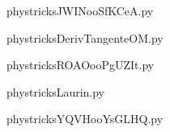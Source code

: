    

    \clearpage
    


    \newcommand{\CaptionFigJWINooSfKCeA}{<+Type your caption here+>}
    \begin{center}
        
    \end{center}
    phystricksJWINooSfKCeA.py

    

    \clearpage
    


    \newcommand{\CaptionFigDerivTangenteOM}{<+Type your caption here+>}
    \begin{center}
        
    \end{center}
    phystricksDerivTangenteOM.py

    

    \clearpage
    


    \newcommand{\CaptionFigROAOooPgUZIt}{<+Type your caption here+>}
    \begin{center}
        
    \end{center}
    phystricksROAOooPgUZIt.py

    

    \clearpage
    


    \newcommand{\CaptionFigLaurin}{<+Type your caption here+>}
    \begin{center}
        
    \end{center}
    phystricksLaurin.py

    

    \clearpage
    


    \newcommand{\CaptionFigYQVHooYsGLHQ}{<+Type your caption here+>}
    \begin{center}
        
    \end{center}
    phystricksYQVHooYsGLHQ.py

    

    \clearpage
    


